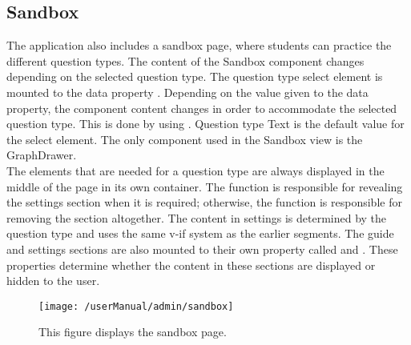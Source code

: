 \subsection{Sandbox}
The application also includes a sandbox page, where students can practice the different question types. The content of the Sandbox component changes depending on the selected question type. The question type select element is mounted to the data property . Depending on the value given to the  data property, the component content changes in order to accommodate the selected question type. This is done by using . Question type Text is the default value for the select element. The only component used in the Sandbox view is the GraphDrawer.
\\[11pt]
The elements that are needed for a question type are always displayed in the middle of the page in its own container. The  function is responsible for revealing the settings section when it is required; otherwise, the function is responsible for removing the section altogether.  The content in settings is determined by the question type and uses the same v-if system as the earlier segments. The guide and settings sections are also mounted to their own property called  and . These properties determine whether the content in these sections are displayed or hidden to the user.

\begin{figure}[H]
	\centering	
	\texttt{[image: /userManual/admin/sandbox]}
	\caption{This figure displays the sandbox page.}
	\label{fig:sandbox}
\end{figure}